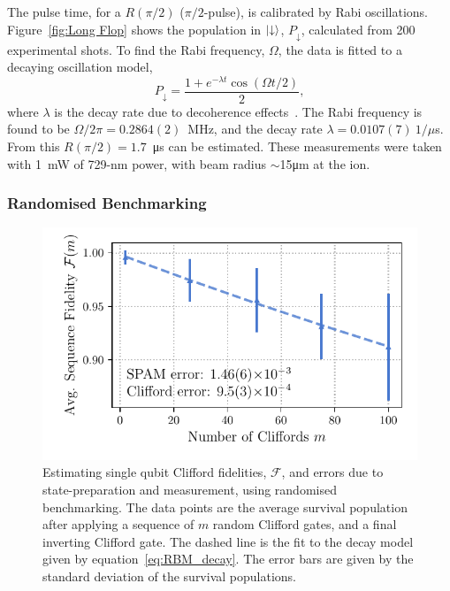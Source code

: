     The pulse time, for a $R(\pi/2)$ ($\pi/2$-pulse), is calibrated by Rabi oscillations. Figure~\ref{fig:Long Flop} shows the population in $\ket{\downarrow}$, $P_\downarrow$, calculated from 200 experimental shots.
    To find the Rabi frequency, $\Omega$, the data is fitted to a decaying oscillation model,
    \begin{equation}
        P_{\downarrow} = \frac{1 + e^{-\lambda t} \cos(\Omega t/2)}{2},
    \end{equation}
    where $\lambda$ is the decay rate due to decoherence
    effects~\cite{wineland1998experimental}. The Rabi frequency is found to be
    $\Omega/2\pi = 0.2864(2)$~\unit{\MHz}, and the decay rate $\lambda =
    0.0107(7)~1/\mu$s.
    From this $R(\pi/2) = 1.7$~\unit{\us} can be estimated.
    These measurements were taken with 1~mW of 729-nm power,
    with beam radius $\sim$15\unit{\um} at the ion.\\
    

\subsubsection{Randomised Benchmarking}

    \begin{figure}
        \begin{center}
        \noindent\includegraphics[width=0.75\linewidth]{
            figures/pdf_figure/rbm_fit.pdf
            }
        \end{center}
        \caption{
            Estimating single qubit Clifford fidelities, $\mathcal{F}$, and errors due to state-preparation and measurement, using randomised benchmarking. 
            The data points are the average survival population after applying a sequence of $m$ random Clifford gates, and a final inverting Clifford gate. The dashed line is the fit to the decay model given by equation~\ref{eq:RBM_decay}. The error bars are given by the standard deviation of the survival populations.
            }
        \label{fig:rbm}
    \end{figure}

